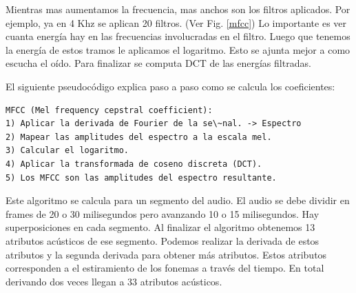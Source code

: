 \documentclass[11pt,a4paper,twoside]{tesis}
\begin{document}
Mientras mas aumentamos la frecuencia, mas anchos son los filtros aplicados. Por ejemplo, ya en 4 Khz se aplican 20 filtros. (Ver Fig. \ref{mfcc}) Lo importante es ver cuanta energía hay en las frecuencias involucradas en el filtro. Luego que tenemos la energía de estos tramos le aplicamos el logaritmo. Esto se ajunta mejor a como escucha el oído. Para finalizar se computa DCT de las energías filtradas. 

El siguiente pseudocódigo explica paso a paso como se calcula los coeficientes:
\begin{lstlisting}
MFCC (Mel frequency cepstral coefficient):
1) Aplicar la derivada de Fourier de la se\~nal. -> Espectro
2) Mapear las amplitudes del espectro a la escala mel.
3) Calcular el logaritmo.
4) Aplicar la transformada de coseno discreta (DCT).
5) Los MFCC son las amplitudes del espectro resultante.
\end{lstlisting}

Este algoritmo se calcula para un segmento del audio. El audio se debe dividir en frames de 20 o 30 milisegundos pero avanzando 10 o 15 milisegundos. Hay superposiciones en cada segmento. Al finalizar el algoritmo obtenemos 13 atributos acústicos de ese segmento. Podemos realizar la derivada de estos atributos y la segunda derivada para obtener más atributos. Estos atributos corresponden a el estiramiento de los fonemas a través del tiempo. En total derivando dos veces llegan a 33 atributos acústicos.
\end{document}
